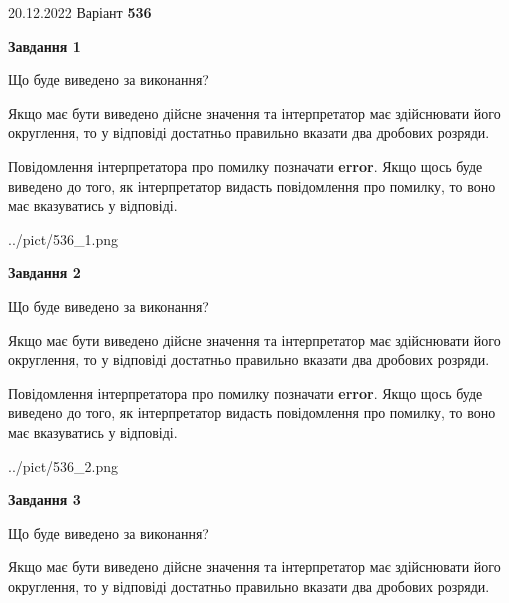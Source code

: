 \documentclass[12pt, ukrainian]{article}
\begin{document}
{20.12.2022 Варіант \No \textbf { 536 }\par}
{
\begin {Large}

{\begin {center}\textbf{Завдання 1}\end {center}}\par
Що буде виведено за виконання? \par

Якщо має бути виведено дійсне значення та інтерпретатор має здійснювати його округлення, 
то у відповіді достатньо правильно вказати два дробових розряди.

Повідомлення інтерпретатора про помилку позначати \textbf{error}.
Якщо щось буде виведено до того, як інтерпретатор видасть повідомлення про помилку, 
то воно має вказуватись у відповіді. \par

\begin{center}
	{../pict/536_1.png}
\end{center}
\newpage

{\begin {center}\textbf{Завдання 2}\end {center}}\par
Що буде виведено за виконання? \par

Якщо має бути виведено дійсне значення та інтерпретатор має здійснювати його округлення, 
то у відповіді достатньо правильно вказати два дробових розряди.

Повідомлення інтерпретатора про помилку позначати \textbf{error}.
Якщо щось буде виведено до того, як інтерпретатор видасть повідомлення про помилку, 
то воно має вказуватись у відповіді. \par

\begin{center}
	{../pict/536_2.png}
\end{center}
\newpage

{\begin {center}\textbf{Завдання 3}\end {center}}\par
Що буде виведено за виконання? \par

Якщо має бути виведено дійсне значення та інтерпретатор має здійснювати його округлення, 
то у відповіді достатньо правильно вказати два дробових розряди.


\end{Large}}
\end{document}
